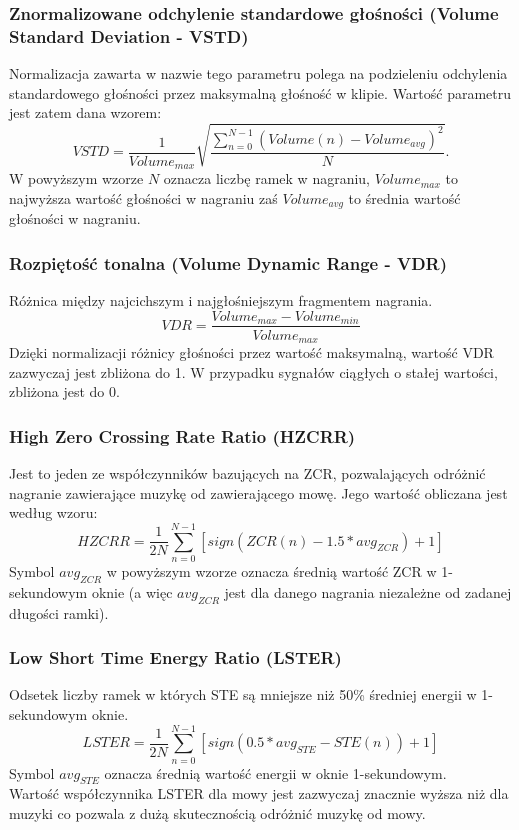 \documentclass[a4paper]{article}
\begin{document}
\subsubsection{Znormalizowane odchylenie standardowe głośności (Volume Standard Deviation - VSTD)}
Normalizacja zawarta w nazwie tego parametru polega na podzieleniu odchylenia standardowego głośności przez maksymalną głośność w klipie. Wartość parametru jest zatem dana wzorem:
\begin{equation}
VSTD = \frac{1}{Volume_{max}}\sqrt{\frac{\sum_{n=0}^{N-1}(Volume(n)-Volume_{avg})^2}{N}}.
\end{equation}
W powyższym wzorze \textit{$N$} oznacza liczbę ramek w nagraniu, \textit{$Volume_{max}$} to najwyższa wartość głośności w nagraniu zaś \textit{$Volume_{avg}$} to średnia wartość głośności w nagraniu.

\subsubsection{Rozpiętość tonalna (Volume Dynamic Range - VDR)}
Różnica między najcichszym i najgłośniejszym fragmentem nagrania. 
\begin{equation}
VDR = \frac{Volume_{max} - Volume_{min}}{Volume_{max}}
\end{equation}
Dzięki normalizacji różnicy głośności przez wartość maksymalną, wartość VDR zazwyczaj jest zbliżona do 1. W przypadku sygnałów ciągłych o stałej wartości, zbliżona jest do 0.

\subsubsection{High Zero Crossing Rate Ratio (HZCRR)}
Jest to jeden ze współczynników bazujących na ZCR, pozwalających odróżnić nagranie zawierające muzykę od zawierającego mowę. Jego wartość obliczana jest według wzoru:
\begin{equation}
HZCRR = \frac{1}{2N}\sum_{n=0}^{N-1}[sign(ZCR(n)-1.5*avg_{ZCR})+1]
\end{equation}
Symbol $avg_{ZCR}$ w powyższym wzorze oznacza średnią wartość ZCR w 1-sekundowym oknie (a więc $avg_{ZCR}$ jest dla danego nagrania niezależne od zadanej długości ramki).

\subsubsection{Low Short Time Energy Ratio (LSTER)}
Odsetek liczby ramek w których STE są mniejsze niż 50\% średniej energii w 1-sekundowym oknie. 
\begin{equation}
LSTER = \frac{1}{2N}\sum_{n=0}^{N-1}[sign(0.5*avg_{STE}-STE(n))+1]
\end{equation}
Symbol $avg_{STE}$ oznacza średnią wartość energii w oknie 1-sekundowym.\\
Wartość współczynnika LSTER dla mowy jest zazwyczaj znacznie wyższa niż dla muzyki co pozwala z dużą skutecznością odróżnić muzykę od mowy.
\end{document}
